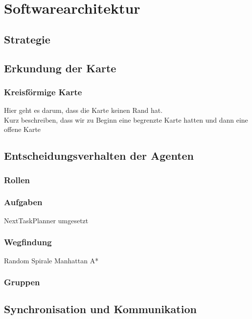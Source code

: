 \chapter{Softwarearchitektur}

\section{Strategie}


\section{Erkundung der Karte}

\subsection{Kreisförmige Karte}

Hier geht es darum, dass die Karte keinen Rand hat. \\
Kurz beschreiben, dass wir zu Beginn eine begrenzte Karte hatten und dann eine offene Karte

\section{Entscheidungsverhalten der Agenten}

\subsection{Rollen}


\subsection{Aufgaben}
NextTaskPlanner umgesetzt

\subsection{Wegfindung}
Random \newline
Spirale \newline
Manhattan \newline
A*

\subsection{Gruppen}


\section{Synchronisation und Kommunikation}